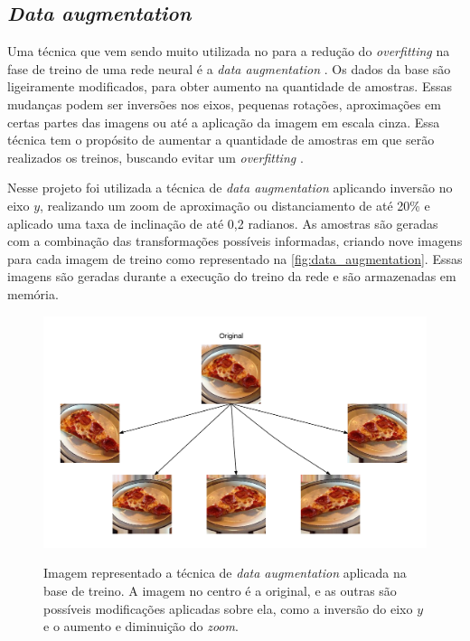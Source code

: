 \subsection{\textit{Data augmentation}}
Uma técnica que vem sendo muito utilizada no para a redução do \textit{overfitting} na fase de treino de uma rede neural é a \textit{data augmentation} \cite{cui2015data}. 
Os dados da base são ligeiramente modificados, para obter aumento na quantidade de amostras.
Essas mudanças podem ser inversões nos eixos, pequenas rotações, aproximações em certas partes das imagens ou até a aplicação da imagem em escala cinza.
Essa técnica tem o propósito de aumentar a quantidade de amostras em que serão realizados os treinos, buscando evitar um \textit{overfitting} \cite{imaginetArticle}.
\par Nesse projeto foi utilizada a técnica de \textit{data augmentation} aplicando inversão no eixo $y$, realizando um zoom de aproximação ou distanciamento de até 20\% e aplicado uma taxa de inclinação de até 0,2 radianos. As amostras são geradas com a combinação das transformações possíveis informadas, criando nove imagens para cada imagem de treino como representado na \autoref{fig:data_augmentation}. Essas imagens são geradas durante a execução do treino da rede e são armazenadas em memória.

\begin{figure}[H]
  \centering
  \caption{Imagem representado a técnica de \textit{data augmentation} aplicada na base de treino. A imagem no centro é a original, e as outras são possíveis modificações aplicadas sobre ela, como a inversão do eixo $y$ e o aumento e diminuição do \textit{zoom}.}
  \includegraphics[width=500pt]{dados/figuras/data_augmentation}
  \label{fig:data_augmentation}
\end{figure}

